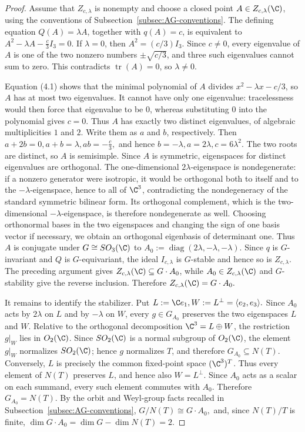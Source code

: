 \documentclass[12pt,leqno]{amsart}
\numberwithin{equation}{section} \newtheorem{thm}{Theorem}[section] \newtheorem{lem}[thm]{Lemma} \newtheorem{ex}[thm]{Example} \newtheorem{prop}[thm]{Proposition} \newtheorem{cor}[thm]{Corollary} \newtheorem{defi}[thm]{Definition} \newtheorem{rmk}[thm]{Remark} \newtheorem{notation}[thm]{Notation}
\begin{document}
\begin{proof}
Assume that $Z_{c,\lambda}$ is nonempty and choose a closed point $A\in Z_{c,\lambda}(\C)$, using the conventions of Subsection~\ref{subsec:AG-conventions}. The defining equation $Q(A)=\lambda A$, together with $q(A)=c$, is equivalent to \(A^2-\lambda A-\frac c3I_3=0\). If $\lambda=0$, then $A^2=(c/3)I_3$. Since $c\ne0$, every eigenvalue of $A$ is one of the two nonzero numbers $\pm\sqrt{c/3}$, and three such eigenvalues cannot sum to zero. This contradicts $\operatorname{tr}(A)=0$, so $\lambda\ne0$.

Equation (4.1) shows that the minimal polynomial of $A$ divides $x^2-\lambda x-c/3$, so $A$ has at most two eigenvalues. It cannot have only one eigenvalue: tracelessness would then force that eigenvalue to be $0$, whereas substituting $0$ into the polynomial gives $c=0$. Thus $A$ has exactly two distinct eigenvalues, of algebraic multiplicities $1$ and $2$. Write them as $a$ and $b$, respectively. Then \(a+2b=0,a+b=\lambda,ab=-\frac c3,\) and hence \(b=-\lambda,a=2\lambda,c=6\lambda^2.\) The two roots are distinct, so $A$ is semisimple. Since $A$ is symmetric, eigenspaces for distinct eigenvalues are orthogonal. The one-dimensional $2\lambda$-eigenspace is nondegenerate: if a nonzero generator were isotropic, it would be orthogonal both to itself and to the $-\lambda$-eigenspace, hence to all of $\C^3$, contradicting the nondegeneracy of the standard symmetric bilinear form. Its orthogonal complement, which is the two-dimensional $-\lambda$-eigenspace, is therefore nondegenerate as well. Choosing orthonormal bases in the two eigenspaces and changing the sign of one basis vector if necessary, we obtain an orthogonal eigenbasis of determinant one. Thus $A$ is conjugate under $G\cong SO_3(\C)$ to \(A_0:=\operatorname{diag}(2\lambda,-\lambda,-\lambda).\) Since $q$ is $G$-invariant and $Q$ is $G$-equivariant, the ideal $I_{c,\lambda}$ is $G$-stable and hence so is $Z_{c,\lambda}$. The preceding argument gives $Z_{c,\lambda}(\C)\subseteq G\cdot A_0$, while $A_0\in Z_{c,\lambda}(\C)$ and $G$-stability give the reverse inclusion. Therefore \(Z_{c,\lambda}(\C)=G\cdot A_0.\)

It remains to identify the stabilizer. Put \(L:=\C e_1,W:=L^\perp=\langle e_2,e_3\rangle.\) Since $A_0$ acts by $2\lambda$ on $L$ and by $-\lambda$ on $W$, every $g\in G_{A_0}$ preserves the two eigenspaces $L$ and $W$. Relative to the orthogonal decomposition $\C^3=L\oplus W$, the restriction $g|_W$ lies in $O_2(\C)$. Since $SO_2(\C)$ is a normal subgroup of $O_2(\C)$, the element $g|_W$ normalizes $SO_2(\C)$; hence $g$ normalizes $T$, and therefore $G_{A_0}\subseteq N(T)$. Conversely, $L$ is precisely the common fixed-point space $(\C^3)^T$. Thus every element of $N(T)$ preserves $L$, and hence also $W=L^\perp$. Since $A_0$ acts as a scalar on each summand, every such element commutes with $A_0$. Therefore \(G_{A_0}=N(T).\) By the orbit and Weyl-group facts recalled in Subsection~\ref{subsec:AG-conventions}, \(G/N(T)\cong G\cdot A_0,\) and, since $N(T)/T$ is finite, \(\dim G\cdot A_0=\dim G-\dim N(T)=2.\)


\end{proof}
\end{document}
